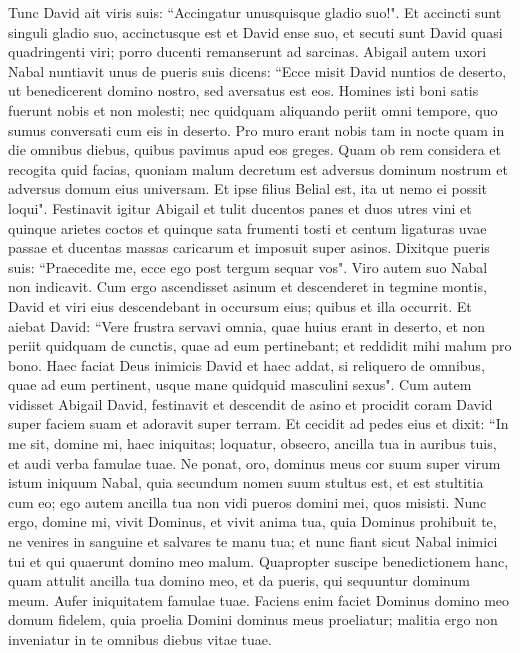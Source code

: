 \begin{biblechapter}
\verse Tunc David ait viris suis: “Accingatur unusquisque gladio suo!". Et accincti sunt singuli gladio suo, accinctusque est et David ense suo, et secuti sunt David quasi quadringenti viri; porro ducenti remanserunt ad sarcinas. 
\verse Abigail autem uxori Nabal nuntiavit unus de pueris suis dicens: “Ecce misit David nuntios de deserto, ut benedicerent domino nostro, sed aversatus est eos.  
\verse Homines isti boni satis fuerunt nobis et non molesti; nec quidquam aliquando periit omni tempore, quo sumus conversati cum eis in deserto. 
\verse Pro muro erant nobis tam in nocte quam in die omnibus diebus, quibus pavimus apud eos greges. 
\verse Quam ob rem considera et recogita quid facias, quoniam malum decretum est adversus dominum nostrum et adversus domum eius universam. Et ipse filius Belial est, ita ut nemo ei possit loqui". 
\verse Festinavit igitur Abigail et tulit ducentos panes et duos utres vini et quinque arietes coctos et quinque sata frumenti tosti et centum ligaturas uvae passae et ducentas massas caricarum et imposuit super asinos. 
\verse Dixitque pueris suis: “Praecedite me, ecce ego post tergum sequar vos". Viro autem suo Nabal non indicavit. 
\verse Cum ergo ascendisset asinum et descenderet in tegmine montis, David et viri eius descendebant in occursum eius; quibus et illa occurrit. 
\verse Et aiebat David: “Vere frustra servavi omnia, quae huius erant in deserto, et non periit quidquam de cunctis, quae ad eum pertinebant; et reddidit mihi malum pro bono. 
\verse Haec faciat Deus inimicis David et haec addat, si reliquero de omnibus, quae ad eum pertinent, usque mane quidquid masculini sexus". 
\verse Cum autem vidisset Abigail David, festinavit et descendit de asino et procidit coram David super faciem suam et adoravit super terram. 
\verse Et cecidit ad pedes eius et dixit: “In me sit, domine mi, haec iniquitas; loquatur, obsecro, ancilla tua in auribus tuis, et audi verba famulae tuae.  
\verse Ne ponat, oro, dominus meus cor suum super virum istum iniquum Nabal, quia secundum nomen suum stultus est, et est stultitia cum eo; ego autem ancilla tua non vidi pueros domini mei, quos misisti. 
\verse Nunc ergo, domine mi, vivit Dominus, et vivit anima tua, quia Dominus prohibuit te, ne venires in sanguine et salvares te manu tua; et nunc fiant sicut Nabal inimici tui et qui quaerunt domino meo malum. 
\verse Quapropter suscipe benedictionem hanc, quam attulit ancilla tua domino meo, et da pueris, qui sequuntur dominum meum. 
\verse Aufer iniquitatem famulae tuae. Faciens enim faciet Dominus domino meo domum fidelem, quia proelia Domini dominus meus proeliatur; malitia ergo non inveniatur in te omnibus diebus vitae tuae. 

\end{biblechapter}
